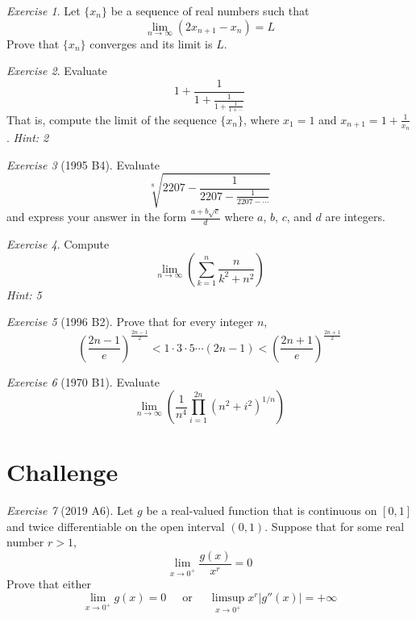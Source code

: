 \documentclass{article}
\theoremstyle{definition}
\theoremstyle{remark}
\newtheorem{exercise}{Exercise}
\begin{document}
\begin{exercise}
Let $\{x_n\}$ be a sequence of real numbers such that \[ \lim_{n\to\infty} (2x_{n+1}-x_n)=L\] Prove that $\{x_n\}$ converges and its limit is $L$.
\end{exercise}

\begin{exercise}
Evaluate
\[1+\frac{1}{1+\frac{1}{1+\frac{1}{1+\cdots}}}\]
That is, compute the limit of the sequence $\{x_n\}$, where $x_1 = 1$ and $x_{n+1}=1+\frac{1}{x_n}$. \emph{Hint: 2}
\end{exercise}

\begin{exercise}[1995 B4]
Evaluate
\[\sqrt[8]{2207 - \frac{1}{2207-\frac{1}{2207-\cdots}}}\] and express your answer in the form $\frac{a+b\sqrt{c}}{d}$ where $a$, $b$, $c$, and $d$ are integers.
\end{exercise}

\begin{exercise}
Compute
\[\lim_{n\to\infty}\left(\sum_{k=1}^n \frac{n}{k^2+n^2}\right)\] \emph{Hint: 5}
\end{exercise}

\begin{exercise}[1996 B2]
Prove that for every integer $n$, 
\[\left(\frac{2n-1}{e}\right)^{\frac{2n-1}{2}} < 1\cdot 3 \cdot 5 \cdots (2n-1) < \left(\frac{2n+1}{e}\right)^{\frac{2n+1}{2}}\]
\end{exercise}

\begin{exercise}[1970 B1]
Evaluate \[\lim_{n\to\infty}\left(\frac{1}{n^4} \prod_{i=1}^{2n} (n^2+i^2)^{1/n}\right)\]
\end{exercise}

\section{Challenge}

\begin{exercise}[2019 A6]
Let $g$ be a real-valued function that is continuous on $[0,1]$ and twice differentiable on the open interval $(0,1)$. Suppose that for some real number $r>1$, 
\[\lim_{x\to 0^+} \frac{g(x)}{x^r}=0\] Prove that either 
\[\lim_{x\to 0^+} g(x)=0 \ \ \ \ \ \text{     or   }\ \ \ \ \  \limsup_{x\to 0^+}x^r|g''(x)| = +\infty\]
\end{exercise}

\pagebreak
\end{document}
